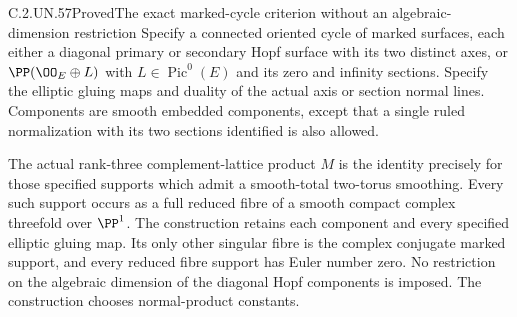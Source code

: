\begin{statement}{C.2.UN.57}{Proved}{The exact marked-cycle criterion without an algebraic-dimension restriction}
Specify a connected oriented cycle of marked surfaces, each either a
diagonal primary or secondary Hopf surface with its two distinct axes,
or $\PP(\OO_E\oplus L)$ with $L\in\operatorname{Pic}^0(E)$ and its
zero and infinity sections. Specify the elliptic gluing maps and
duality of the actual axis or section normal lines. Components are
smooth embedded components, except that a single ruled normalization
with its two sections identified is also allowed.

The actual rank-three complement-lattice product $M$ is the identity
precisely for those specified supports which admit a smooth-total
two-torus smoothing. Every such support occurs as a full reduced fibre
of a smooth compact complex threefold over $\PP^1$. The construction
retains each component and every specified elliptic gluing map. Its
only other singular fibre is the complex conjugate marked support,
and every reduced fibre support has Euler number zero. No restriction
on the algebraic dimension of the diagonal Hopf components is imposed.
The construction chooses normal-product constants.
\end{statement}

